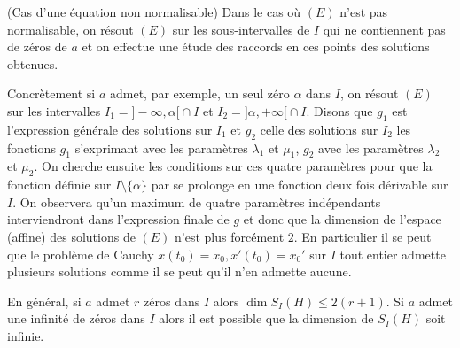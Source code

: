 \begin{remap}
\unite(Cas d'une équation non normalisable)
Dans le cas où $(E)$ n'est pas normalisable, on résout $(E)$ sur les sous-intervalles de $I$ qui ne contiennent pas de zéros de $a$ et on effectue une étude des raccords en ces points des solutions obtenues.

\nb
Concrètement si $a$ admet, par exemple, un seul zéro $\alpha$ dans $I$, on résout $(E)$ sur les intervalles $I_1={}]-\infty,\alpha[{}\cap I$ et $I_2={}]\alpha,+\infty[{}\cap I$. Disons que $g_1$ est l'expression générale des solutions sur $I_1$ et $g_2$ celle des solutions sur $I_2$ les fonctions $g_1$ s'exprimant avec les paramètres $\lambda _1$ et $\mu_1$, $g_2$ avec les paramètres $\lambda_2$ et $\mu_2$. On cherche ensuite les conditions sur ces quatre paramètres pour que la fonction définie sur $I\setminus \{\alpha\}$ par
se prolonge en une fonction deux fois dérivable sur $I$. On observera qu'un maximum de quatre paramètres indépendants interviendront dans l'expression finale de $g$ et donc que la dimension de l'espace (affine) des solutions de $(E)$ n'est plus forcément $2$. En particulier il se peut que le problème de Cauchy $x(t_0)=x_0, x'(t_0)=x_0'$ sur $I$ tout entier admette plusieurs solutions comme il se peut qu'il n'en admette aucune.

En général, si $a$ admet $r$ zéros dans $I$ alors $\dim S_I(H)\leq 2(r+1)$. Si $a$ admet une infinité de zéros dans $I$ alors il est possible que la dimension de $S_I(H)$ soit infinie.
\endnb
\end{remap}

